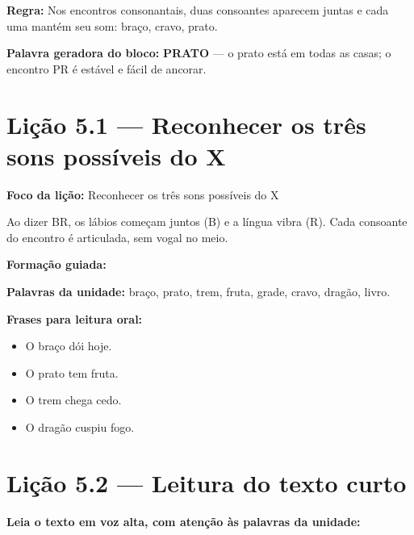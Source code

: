 \textbf{Regra:} Nos encontros consonantais, duas consoantes aparecem juntas e cada uma mantém seu som: braço, cravo, prato.

\textbf{Palavra geradora do bloco:} \textbf{PRATO} --- o prato está em todas as casas; o encontro PR é estável e fácil de ancorar.

\section{Lição 5.1 --- Reconhecer os três sons possíveis do X}

\textbf{Foco da lição:} Reconhecer os três sons possíveis do X


\begin{boquinha}
Ao dizer BR, os lábios começam juntos (B) e a língua vibra (R). Cada consoante do encontro é articulada, sem vogal no meio.
\end{boquinha}

\noindent\textbf{Formação guiada:}

\begin{center}
\end{center}

\noindent\textbf{Palavras da unidade:} braço, prato, trem, fruta, grade, cravo, dragão, livro.

\noindent\textbf{Frases para leitura oral:}
\begin{itemize}[leftmargin=1.6em]
  \item O braço dói hoje.
  \item O prato tem fruta.
  \item O trem chega cedo.
  \item O dragão cuspiu fogo.
\end{itemize}

\section{Lição 5.2 --- Leitura do texto curto}

\noindent\textbf{Leia o texto em voz alta, com atenção às palavras da unidade:}


